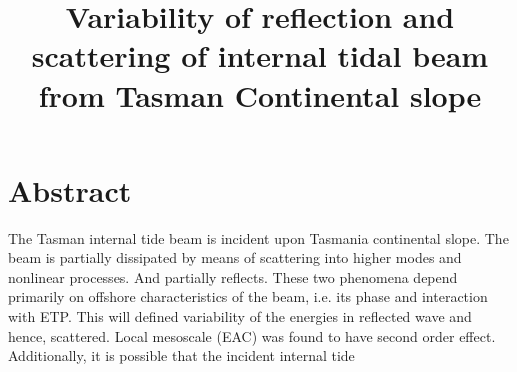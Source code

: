 



\title{Variability of reflection and scattering of internal tidal beam from Tasman Continental slope}
\maketitle

\section{Abstract}
The Tasman internal tide beam is incident upon Tasmania continental slope. The beam is partially dissipated by means of scattering into higher modes and nonlinear processes. And partially reflects. These two phenomena depend primarily on offshore characteristics of the beam, i.e. its phase and interaction with ETP. This will defined variability of the energies in reflected wave and hence, scattered. Local mesoscale (EAC) was found to have second order effect. Additionally, it is possible that the incident internal tide

